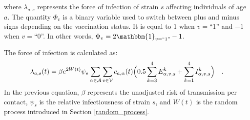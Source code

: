 where $\lambda_{a,s}$ represents the force of infection of strain $s$ affecting individuals of age $a$. The quantity $\Phi_v$ is a binary variable
used to switch between plus and minus signs depending on the vaccination status. It is equal to $1$ when
$v=$``1'' and $-1$ when $v=$``0''. In other words, $\Phi_v = 2\mathbbm{1}_{v=``1"} - 1$. 

The force of infection is calculated as:
\begin{equation}
    \label{foi}
 \lambda_{a,s}(t) = \beta e^{2W(t)} \psi_{s} \sum_{\alpha \in \mathcal{A}} \sum_{v \in \mathcal{V}} c_{a,\alpha}(t) \Bigl( 0.5 \sum_{k=3}^{4} E_{\alpha,v,s}^{k} + \sum_{k=1}^{4} I_{\alpha,v,s}^{k} \Bigr) \quad .
\end{equation}
In the previous equation, $\beta$ represents the unadjusted risk of transmission per contact, $\psi_{s}$ is the relative infectiousness of strain $s$, and $W(t)$ is
the random process introduced in Section \ref{random_process}.